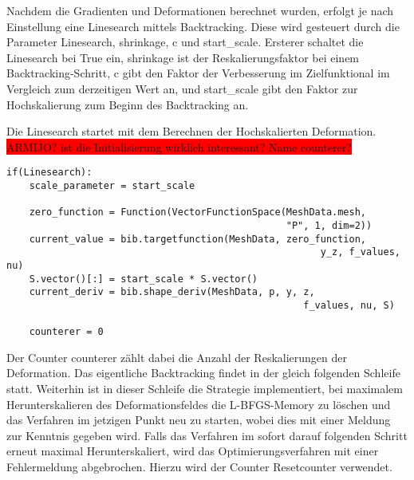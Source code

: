 \label{backtracking}
Nachdem die Gradienten und Deformationen berechnet wurden, erfolgt je nach Einstellung eine Linesearch mittels Backtracking. Diese wird gesteuert durch die Parameter \textsf{Linesearch}, \textsf{shrinkage}, \textsf{c} und \textsf{start\_scale}. Ersterer schaltet die Linesearch bei \textsf{True} ein, \textsf{shrinkage} ist der Reskalierungsfaktor bei einem Backtracking-Schritt, \textsf{c} gibt den Faktor der Verbesserung im Zielfunktional im Vergleich zum derzeitigen Wert an, und \textsf{start\_scale} gibt den Faktor zur Hochskalierung zum Beginn des Backtracking an.

Die Linesearch startet mit dem Berechnen der Hochskalierten Deformation.
\colorbox{red}{ARMIJO? ist die Initialisierung wirklich interessant? Name counterer?}
\begin{lstlisting}
if(Linesearch):
	scale_parameter = start_scale

    zero_function = Function(VectorFunctionSpace(MeshData.mesh,
                                                 "P", 1, dim=2))
    current_value = bib.targetfunction(MeshData, zero_function,
        								               y_z, f_values, nu)
    S.vector()[:] = start_scale * S.vector()
    current_deriv = bib.shape_deriv(MeshData, p, y, z, 
    								                f_values, nu, S)

    counterer = 0
\end{lstlisting}
Der Counter \textsf{counterer} zählt dabei die Anzahl der Reskalierungen der Deformation. Das eigentliche Backtracking findet in der gleich folgenden Schleife statt. Weiterhin ist in dieser Schleife die Strategie implementiert, bei maximalem Herunterskalieren des Deformationsfeldes die L-BFGS-Memory zu löschen und das Verfahren im jetzigen Punkt neu zu starten, wobei dies mit einer Meldung zur Kenntnis gegeben wird. Falls das Verfahren im sofort darauf folgenden Schritt erneut maximal Herunterskaliert, wird das Optimierungsverfahren mit einer Fehlermeldung abgebrochen. Hierzu wird der Counter \textsf{Resetcounter} verwendet.
\newpage
